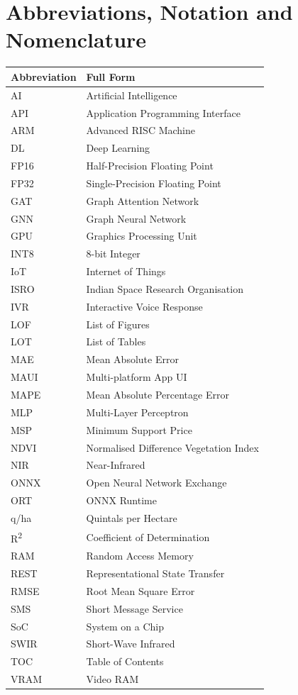 \chapter*{Abbreviations, Notation and Nomenclature}

\begin{table}[h]
\centering
\begin{tabular}{ll}
\hline
\textbf{Abbreviation} & \textbf{Full Form} \\
\hline
AI       & Artificial Intelligence \\
API      & Application Programming Interface \\
ARM      & Advanced RISC Machine \\
DL       & Deep Learning \\
FP16     & Half-Precision Floating Point \\
FP32     & Single-Precision Floating Point \\
GAT      & Graph Attention Network \\
GNN      & Graph Neural Network \\
GPU      & Graphics Processing Unit \\
INT8     & 8-bit Integer \\
IoT      & Internet of Things \\
ISRO     & Indian Space Research Organisation \\
IVR      & Interactive Voice Response \\
LOF      & List of Figures \\
LOT      & List of Tables \\
MAE      & Mean Absolute Error \\
MAUI     & Multi-platform App UI \\
MAPE     & Mean Absolute Percentage Error \\
MLP      & Multi-Layer Perceptron \\
MSP      & Minimum Support Price \\
NDVI     & Normalised Difference Vegetation Index \\
NIR      & Near-Infrared \\
ONNX     & Open Neural Network Exchange \\
ORT      & ONNX Runtime \\
q/ha     & Quintals per Hectare \\
R\textsuperscript{2} & Coefficient of Determination \\
RAM      & Random Access Memory \\
REST     & Representational State Transfer \\
RMSE     & Root Mean Square Error \\
SMS      & Short Message Service \\
SoC      & System on a Chip \\
SWIR     & Short-Wave Infrared \\
TOC      & Table of Contents \\
VRAM     & Video RAM \\
\hline
\end{tabular}
\end{table}
